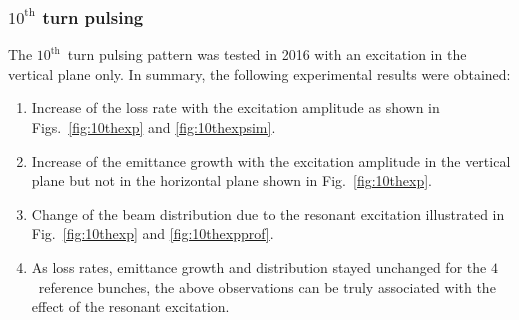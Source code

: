 \documentclass[%
 reprint,
 amsmath,amssymb,
 aps,
prstab,
]{revtex4-1}
\begin{document}
\subsubsection{$10^{\mathrm{th}}$ turn pulsing\label{sec:simex10}}
The $10^{\mathrm{th}}$~turn pulsing pattern was tested in 2016 with an excitation in the vertical plane only. In summary, the following experimental results were obtained:
\begin{enumerate}
	\item Increase of the loss rate with the excitation amplitude as shown in Figs.~\ref{fig:10thexp} and \ref{fig:10thexpsim}.
	\item Increase of the emittance growth with the excitation amplitude in the vertical plane but not in the horizontal plane shown in Fig.~\ref{fig:10thexp}.
	\item Change of the beam distribution due to the resonant excitation illustrated in Fig.~\ref{fig:10thexp} and \ref{fig:10thexpprof}.
	\item As loss rates, emittance growth and distribution stayed unchanged for the $4$~reference bunches, the above observations can be truly associated with the effect of the resonant excitation.	
\end{enumerate}
\end{document}
